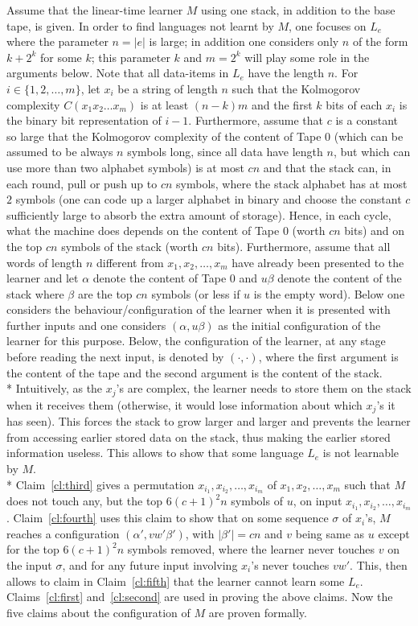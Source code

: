 \documentclass{LMCS}
\theoremstyle{plain}\newtheorem{athm}[thm]{Theorem}
\theoremstyle{plain}\newtheorem{aprop}[thm]{Proposition}
\theoremstyle{plain}\newtheorem{aprob}[thm]{Open Problem}
\theoremstyle{plain}\newtheorem{acor}[thm]{Corollary}
\theoremstyle{plain}\newtheorem{alem}[thm]{Lemma}
\theoremstyle{definition}\newtheorem{adefn}[thm]{Definition}
\theoremstyle{definition}\newtheorem{arem}[thm]{Remark}
\theoremstyle{plain}\newtheorem{aexmp}[thm]{Example}
\theoremstyle{plain}\newtheorem{aclm}[thm]{Claim}
\def\sp{\\*\indent}
\begin{document}
\proof
Assume that the linear-time learner $M$ using one stack, 
in addition to the base tape,
is given.  In order to find languages not
learnt by $M$, one focuses on $L_e$ where the parameter $n = |e|$ is
large; in addition one considers only $n$ of the form $k+2^k$ for some $k$;
this parameter $k$ and $m = 2^k$ will play some role in the arguments below.
Note that all data-items in $L_e$ have the length $n$.
For $i \in \{1,2,\ldots,m\}$, let $x_i$ be a
string of length $n$ such that the Kolmogorov
complexity $C(x_1 x_2 \ldots x_m)$ is at least $(n-k)m$ and the first $k$ bits
of each $x_i$ is the binary bit representation of $i-1$. Furthermore,
assume that $c$ is a constant so large that the Kolmogorov complexity
of the content of Tape $0$ (which can be assumed to be always $n$
symbols long, since
all data have length $n$, but which can use more than two alphabet symbols)
is at most $cn$ and that the stack can, in each round, pull or push
up to $cn$ symbols, where the stack alphabet has at most $2$ symbols
(one can code up a larger alphabet in binary and choose the constant
$c$ sufficiently large to absorb the extra amount of storage).
Hence, in each cycle, what the machine does depends on the content of
Tape $0$ (worth $cn$ bits) and on the top $cn$ symbols of the stack
(worth $cn$ bits). Furthermore, assume that all words of length $n$
different from $x_1,x_2,\ldots,x_m$ have already been presented to the learner
and let $\alpha$ denote the content of Tape $0$ and $u\beta$ denote the content
of the stack where $\beta$ are the top $cn$ symbols (or less if $u$ is the
empty word). Below one considers the behaviour/configuration of the learner
when it is presented with further inputs and one considers $(\alpha,u\beta)$
as the initial configuration of the learner for this purpose.
Below, the configuration of the learner, at any stage before reading the
next input, is denoted by $(\cdot,\cdot)$, where the first argument
is the content of the tape and the second argument is the content
of the stack.
\sp
Intuitively, as the $x_j$'s are complex, the learner needs to store
them on the stack when it receives them (otherwise, it would lose
information about which $x_j$'s it has seen). This forces the stack
to grow larger and larger and prevents the learner from accessing
earlier stored data on the stack, thus making the earlier stored
information useless. This allows to show that some language $L_e$
is not learnable by $M$.
\sp
Claim~\ref{cl:third} gives a permutation 
$x_{i_1},x_{i_2},\ldots,x_{i_m}$ of $x_1,x_2,\ldots,x_m$ such that
$M$ does not touch any, but the top $6(c+1)^2n$ symbols of $u$, on
input $x_{i_1},x_{i_2},\ldots,x_{i_m}$. Claim~\ref{cl:fourth} uses
this claim to show that on some sequence $\sigma$ of $x_i$'s, $M$ reaches a
configuration $(\alpha',vw'\beta')$, with $|\beta'| =cn$ and
$v$ being same as $u$ except for the top $6(c+1)^2n$ symbols removed,
where the learner never touches $v$ on the input 
$\sigma$, and for any future input involving $x_i$'s never
touches $vw'$. This, then allows to claim in Claim~\ref{cl:fifth}
that the learner cannot learn some $L_e$. 
Claims~\ref{cl:first} and~\ref{cl:second} are used in proving the above
claims.
Now the five claims about the configuration of $M$ are proven formally.
\end{document}
